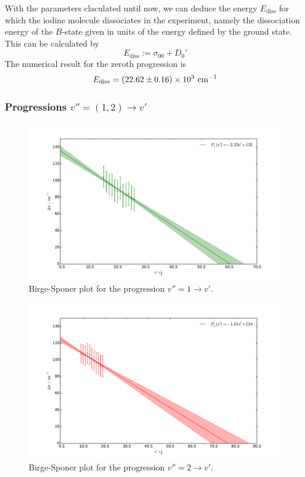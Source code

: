 With the parameters claculated until now, we can deduce the energy $E_\mathrm{diss}$ 
for which the iodine molecule dissociates in the experiment, 
namely the dissociation energy of the $B$-state given in units of the 
energy defined by the ground state. This can be calculated by
\begin{equation}
    E_\mathrm{diss} := \sigma_{00} + D_0'
    \label{eq:E_diss}
\end{equation}
The numerical result for the zeroth progression is
\begin{equation}
    E_\mathrm{diss} = \left(22.62 \pm 0.16\right) \times 10^{3} \ \mathrm{cm^{-1}}
\end{equation}


\subsubsection{Progressions $v'' = (1, 2) \rightarrow v'$}
\begin{figure}
    \centering
    \includegraphics[width=\pltw]{analysis/figures/b_s_1.pdf}
    \caption{Birge-Sponer plot for the progression $v'' = 1 \rightarrow v'$.  
    }
    \label{fig:b_s_1}
\end{figure}

\begin{figure}
    \centering
    \includegraphics[width=\pltw]{analysis/figures/b_s_2.pdf}
    \caption{Birge-Sponer plot for the progression $v'' = 2 \rightarrow v'$.  
    }
    \label{fig:b_s_2}
\end{figure}

